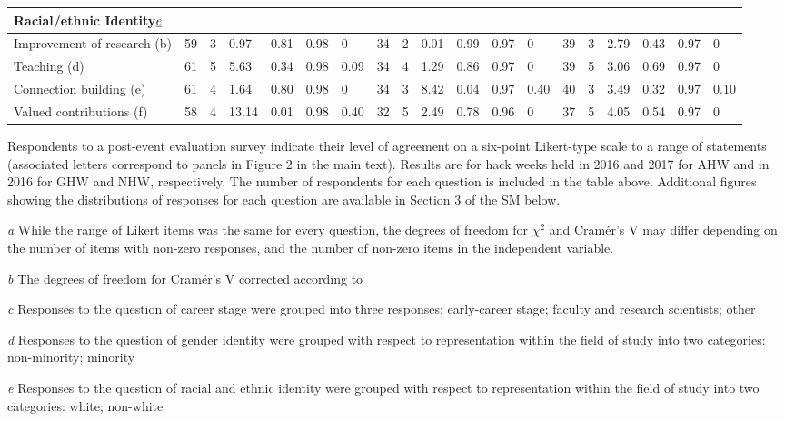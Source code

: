 \documentclass{aastex62}
\begin{document}
\begin{table}
\begin{threeparttable}
\begin{tabularx}{18cm}{p{3.6cm}p{0.42cm}p{0.42cm}p{0.42cm}p{0.42cm}p{0.42cm}p{0.42cm}p{0.42cm}p{0.42cm}p{0.42cm}p{0.42cm}p{0.42cm}p{0.42cm}p{0.42cm}p{0.42cm}p{0.42cm}p{0.42cm}p{0.42cm}p{0.42cm}}
\multicolumn{16}{l}{\textbf{Racial/ethnic Identity$\emph{e}$}} \\ \midrule
Improvement of research (b)  & 59 & 3 & 0.97 & 0.81 & 0.98 & 0 & 34 &2 & 0.01 & 0.99 & 0.97 & 0 & 39 & 3 & 2.79 & 0.43 & 0.97 & 0 \\
Teaching (d) & 61 & 5 & 5.63 & 0.34 & 0.98 & 0.09 & 34 & 4 & 1.29 & 0.86 & 0.97 & 0 & 39 & 5 & 3.06 & 0.69 & 0.97 & 0 \\
Connection building (e) & 61 & 4 & 1.64 & 0.80 & 0.98 & 0 & 34 & 3 & 8.42 & 0.04 & 0.97 & 0.40 & 40 & 3 & 3.49 & 0.32 & 0.97 & 0.10 \\
Valued contributions (f) & 58 & 4 & 13.14 & 0.01 & 0.98 & 0.40 & 32 & 5 & 2.49 & 0.78 & 0.96 & 0 & 37 & 5 & 4.05 & 0.54 & 0.97 & 0 \\ 
\bottomrule
\end{tabularx}
   \begin{tablenotes}
      \item{Respondents to a post-event evaluation survey indicate their level of agreement on a six-point Likert-type scale to a range of statements (associated letters correspond to panels in Figure 2 in the main text). Results are for hack weeks held in 2016 and 2017 for AHW and in 2016 for GHW and NHW, respectively. The number of respondents for each question is included in the table above. Additional figures showing the distributions of responses for each question are available in Section 3 of the SM below.}
      \item[\emph{a}]{While the range of Likert items was the same for every question, the degrees of freedom for $\chi^2$ and Cram\'{e}r's V may differ depending on the number of items with non-zero responses, and the number of non-zero items in the independent variable.}
      \item[\emph{b}]{The degrees of freedom for Cram\'{e}r's V corrected according to~\citep{bergsma2013}}
      \item[\emph{c}]{Responses to the question of career stage were grouped into three responses: early-career stage; faculty and research scientists; other}
      \item[\emph{d}]{Responses to the question of gender identity were grouped with respect to representation within the field of study into two categories: non-minority; minority}
      \item[\emph{e}]{Responses to the question of racial and ethnic identity were grouped with respect to representation within the field of study into two categories: white; non-white}
\end{tablenotes}

\end{threeparttable}
\label{tab:survey}
\end{table}
\end{document}
